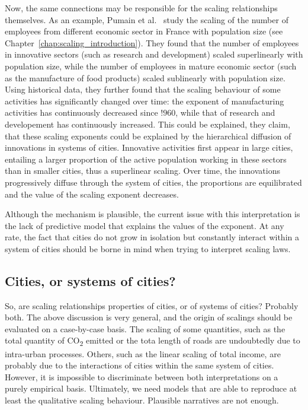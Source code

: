 Now, the same connections may be responsible for the scaling relationships
themselves. As an example, Pumain et al.~\cite{Pumain:2006} study the scaling of
the number of employees from different economic sector in France with population size (see
Chapter~\ref{chap:scaling_introduction}). They found that the number of
employees in innovative sectors (such as research and development) scaled
superlinearly with population size, while the number of employees in mature
economic sector (such as the manufacture of food products) scaled sublinearly
with population size. Using historical data, they further found that the
scaling behaviour of some activities has significantly changed over time: the
exponent of manufacturing activities has continuously decreased since $!960$,
while that of research and developement has continuously increased. This could
be explained, they claim, that these scaling exponents could be explained by the
hierarchical diffusion of innovations in systems of cities. Innovative
activities first appear in large cities, entailing a larger proportion of the
active population working in these sectors than in smaller cities, thus a
superlinear scaling. Over time, the innovations progressively diffuse through
the system of cities, the proportions are equilibrated and the value of the
scaling exponent decreases.

Although the mechanism is plausible, the current issue with this interpretation
is the lack of predictive model that explains the values of the exponent. At any
rate, the fact that cities do not grow in isolation but constantly interact
within a system of cities should be borne in mind when trying to interpret
scaling laws.

\subsection{Cities, or systems of cities?}
\label{sub:cities_or_systems_of_cities_}

So, are scaling relationships properties of cities, or of systems of cities?
Probably both. The above discussion is very general, and the origin of scalings
should be evaluated on a case-by-case basis. The scaling of some quantities,
such as the total quantity of CO\textsubscript{2} emitted or the tota length of
roads are undoubtedly due to intra-urban processes. Others, such as the linear
scaling of total income, are probably due to the interactions of cities within
the same system of cities. However, it is impossible to discriminate between
both interpretations on a purely empirical basis. Ultimately, we need models that are
able to reproduce at least the qualitative scaling behaviour. Plausible
narratives are not enough.


